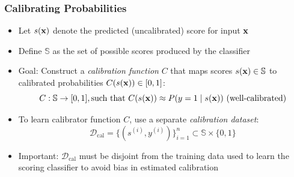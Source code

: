 \documentclass[11pt,compress,t,notes=noshow, xcolor=table]{beamer}
\begin{document}
		

\begin{frame}[t]
  \frametitle{Calibrating Probabilities}

  \begin{itemize}
    \item Let $s(\mathbf{x})$ denote the predicted (uncalibrated) score for input $\mathbf{x}$
    \item Define $\mathbb{S}$ as the set of possible scores produced by the classifier
    \item Goal: Construct a \emph{calibration function} $C$ that maps scores $s(\mathbf{x}) \in \mathbb{S}$ to calibrated probabilities $C(s(\mathbf{x})) \in [0,1]$:
    \[
      C: \mathbb{S} \to [0, 1], \text{such that } C(s(\mathbf{x})) \approx P(y = 1 \mid s(\mathbf{x})) \text{ (well-calibrated)}
    \]
    \item To learn calibrator function $C$, use a separate \emph{calibration dataset}:
    \[
      \mathcal{D}_{\text{cal}} = \{ (s^{(i)}, y^{(i)}) \}_{i=1}^{n} \subset \mathbb{S} \times \{0, 1\}
    \]
    \item Important: $\mathcal{D}_{\text{cal}}$ must be disjoint from the training data used to learn the scoring classifier to avoid bias in estimated calibration
  \end{itemize}

\end{frame}
\end{document}
